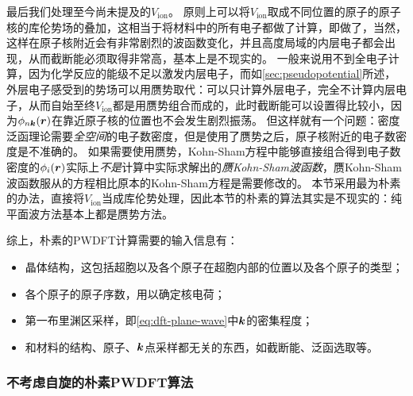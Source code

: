 最后我们处理至今尚未提及的$V_\text{ion}$。
原则上可以将$V_\text{ion}$取成不同位置的原子的原子核的库伦势场的叠加，这相当于将材料中的所有电子都做了计算，即做了，当然，这样在原子核附近会有非常剧烈的波函数变化，并且高度局域的内层电子都会出现，从而截断能必须取得非常高，基本上是不现实的。
一般来说用不到全电子计算，因为化学反应的能级不足以激发内层电子，而如\autoref{sec:pseudopotential}所述，外层电子感受到的势场可以用赝势取代：可以只计算外层电子，完全不计算内层电子，从而自始至终$V_\text{ion}$都是用赝势组合而成的，此时截断能可以设置得比较小，因为$\phi_{n \vb*{k}}(\vb*{r})$在靠近原子核的位置也不会发生剧烈振荡。
但这样就有一个问题：密度泛函理论需要\emph{全空间}的电子数密度，但是使用了赝势之后，原子核附近的电子数密度是不准确的。
如果需要使用赝势，Kohn-Sham方程中能够直接组合得到电子数密度的$\phi_i(\vb*{r})$实际上\emph{不是}计算中实际求解出的\emph{赝Kohn-Sham波函数}，赝Kohn-Sham波函数服从的方程相比原本的Kohn-Sham方程是需要修改的。
本节采用最为朴素的办法，直接将$V_\text{ion}$当成库伦势处理，因此本节的朴素的算法其实是不现实的：纯平面波方法基本上都是赝势方法。

综上，朴素的PWDFT计算需要的输入信息有：
\begin{itemize}
    \item 晶体结构，这包括超胞以及各个原子在超胞内部的位置以及各个原子的类型；
    \item 各个原子的原子序数，用以确定核电荷；
    \item 第一布里渊区采样，即\eqref{eq:dft-plane-wave}中$\vb*{k}$的密集程度；
    \item 和材料的结构、原子、$\vb*{k}$点采样都无关的东西，如截断能、泛函选取等。
\end{itemize}

\subsubsection{不考虑自旋的朴素PWDFT算法}

